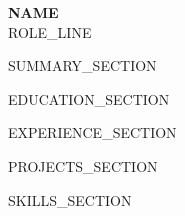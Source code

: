 \documentclass[letterpaper,11pt]{article}
\begin{document}
\begin{center}
    \textbf{\Huge \scshape {{NAME}}} \\ \vspace{1pt}
    \small {{ROLE_LINE}}
\end{center}

{{SUMMARY_SECTION}}

{{EDUCATION_SECTION}}

{{EXPERIENCE_SECTION}}

{{PROJECTS_SECTION}}

{{SKILLS_SECTION}}
\end{document}
